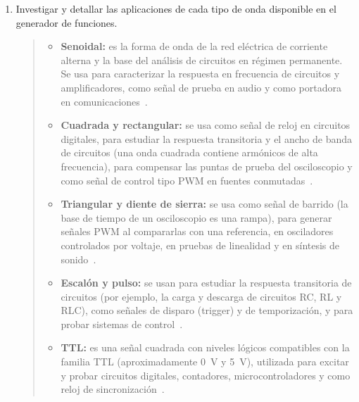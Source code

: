 \documentclass{article}
\begin{document}
\begin{enumerate}
        \item Investigar y detallar las aplicaciones de cada tipo de onda disponible en el generador de funciones.

        \begin{quote}
            \begin{itemize}
                \item \textbf{Senoidal:} es la forma de onda de la red eléctrica de corriente alterna y la base del análisis de circuitos en régimen permanente. Se usa para caracterizar la respuesta en frecuencia de circuitos y amplificadores, como señal de prueba en audio y como portadora en comunicaciones~\cite{alexander2018fundamentos,horowitz2015art}.
                \item \textbf{Cuadrada y rectangular:} se usa como señal de reloj en circuitos digitales, para estudiar la respuesta transitoria y el ancho de banda de circuitos (una onda cuadrada contiene armónicos de alta frecuencia), para compensar las puntas de prueba del osciloscopio y como señal de control tipo PWM en fuentes conmutadas~\cite{horowitz2015art,tektronix2009xyz}.
                \item \textbf{Triangular y diente de sierra:} se usa como señal de barrido (la base de tiempo de un osciloscopio es una rampa), para generar señales PWM al compararlas con una referencia, en osciladores controlados por voltaje, en pruebas de linealidad y en síntesis de sonido~\cite{horowitz2015art,tektronix2009xyz}.
                \item \textbf{Escalón y pulso:} se usan para estudiar la respuesta transitoria de circuitos (por ejemplo, la carga y descarga de circuitos RC, RL y RLC), como señales de disparo (trigger) y de temporización, y para probar sistemas de control~\cite{alexander2018fundamentos,horowitz2015art}.
                \item \textbf{TTL:} es una señal cuadrada con niveles lógicos compatibles con la familia TTL (aproximadamente \SI{0}{\volt} y \SI{5}{\volt}), utilizada para excitar y probar circuitos digitales, contadores, microcontroladores y como reloj de sincronización~\cite{horowitz2015art}.
            \end{itemize}
        \end{quote}


\end{enumerate}
\end{document}
